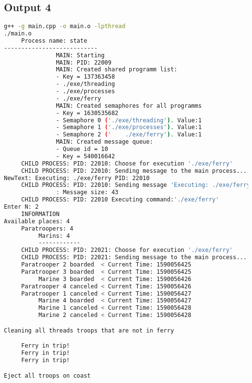\documentclass{article}
\begin{document}
\subsection{Output 4}
\begin{lstlisting}[language=BASH]
g++ -g main.cpp -o main.o -lpthread
./main.o
     Process name: state
---------------------------
               MAIN: Starting
               MAIN: PID: 22009
               MAIN: Created shared programm list:
               - Key = 137363458
               - ./exe/threading
               - ./exe/processes
               - ./exe/ferry
               MAIN: Created semaphores for all programms
               - Key = 1630535682
               - Semaphore 0 ('./exe/threading'). Value:1
               - Semaphore 1 ('./exe/processes'). Value:1
               - Semaphore 2 ('    ./exe/ferry'). Value:1
               MAIN: Created message queue:
               - Queue id = 10
               - Key = 540016642
     CHILD PROCESS: PID: 22010: Choose for execution './exe/ferry'
     CHILD PROCESS: PID: 22010: Sending message to the main process...
NewText: Executing: ./exe/ferry PID: 22010
     CHILD PROCESS: PID: 22010: Sending message 'Executing: ./exe/ferry PID: 22010' to the MAIN process...
               : Message size: 43
     CHILD PROCESS: PID: 22010 Executing command:'./exe/ferry'
Enter N: 2
     INFORMATION
Available places: 4
     Paratroopers: 4
          Marins: 4
          ------------
     CHILD PROCESS: PID: 22021: Choose for execution './exe/ferry'
     CHILD PROCESS: PID: 22021: Sending message to the main process...
     Paratrooper 2 boarded  < Current Time: 1590056425 
     Paratrooper 3 boarded  < Current Time: 1590056425 
          Marine 3 boarded  < Current Time: 1590056426 
     Paratrooper 4 canceled < Current Time: 1590056426 
     Paratrooper 1 canceled < Current Time: 1590056427 
          Marine 4 boarded  < Current Time: 1590056427 
          Marine 1 canceled < Current Time: 1590056428 
          Marine 2 canceled < Current Time: 1590056428 

Cleaning all threads troops that are not in ferry

     Ferry in trip!
     Ferry in trip!
     Ferry in trip!

Eject all troops on coast


\end{lstlisting}
\end{document}
